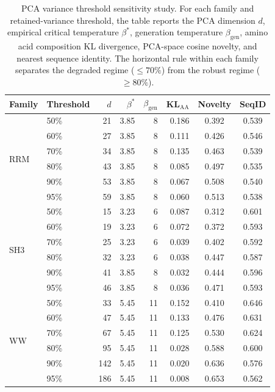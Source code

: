 \begin{table}[p]
\centering
\caption{PCA variance threshold sensitivity study. For each family and retained-variance threshold, the table reports the PCA dimension $d$, empirical critical temperature $\beta^*$, generation temperature $\beta_{\mathrm{gen}}$, amino acid composition KL divergence, PCA-space cosine novelty, and nearest sequence identity. The horizontal rule within each family separates the degraded regime ($\leq 70\%$) from the robust regime ($\geq 80\%$).}
\label{tab:pca-sensitivity}
\scriptsize
\setlength{\tabcolsep}{4pt}
\renewcommand{\arraystretch}{0.85}
\begin{tabular}{@{}llrrrrcc@{}}
\toprule
Family & Threshold & $d$ & $\beta^*$ & $\beta_{\mathrm{gen}}$ & KL$_{\mathrm{AA}}$ & Novelty & SeqID \\
\midrule
\multirow{6}{*}{RRM}
 & 50\% &  21 & 3.85 &  8 & 0.186 & 0.392 & 0.539 \\
 & 60\% &  27 & 3.85 &  8 & 0.111 & 0.426 & 0.546 \\
 & 70\% &  34 & 3.85 &  8 & 0.135 & 0.463 & 0.539 \\
\cmidrule{2-8}
 & 80\% &  43 & 3.85 &  8 & 0.085 & 0.497 & 0.535 \\
 & 90\% &  53 & 3.85 &  8 & 0.067 & 0.508 & 0.540 \\
 & 95\% &  59 & 3.85 &  8 & 0.060 & 0.513 & 0.538 \\
\midrule
\multirow{6}{*}{SH3}
 & 50\% &  15 & 3.23 &  6 & 0.087 & 0.312 & 0.601 \\
 & 60\% &  19 & 3.23 &  6 & 0.072 & 0.372 & 0.593 \\
 & 70\% &  25 & 3.23 &  6 & 0.039 & 0.402 & 0.592 \\
\cmidrule{2-8}
 & 80\% &  32 & 3.23 &  6 & 0.038 & 0.447 & 0.587 \\
 & 90\% &  41 & 3.85 &  8 & 0.032 & 0.444 & 0.596 \\
 & 95\% &  46 & 3.85 &  8 & 0.036 & 0.471 & 0.593 \\
\midrule
\multirow{6}{*}{WW}
 & 50\% &  33 & 5.45 & 11 & 0.152 & 0.410 & 0.646 \\
 & 60\% &  47 & 5.45 & 11 & 0.133 & 0.476 & 0.631 \\
 & 70\% &  67 & 5.45 & 11 & 0.125 & 0.530 & 0.624 \\
\cmidrule{2-8}
 & 80\% &  95 & 5.45 & 11 & 0.028 & 0.588 & 0.600 \\
 & 90\% & 142 & 5.45 & 11 & 0.020 & 0.636 & 0.576 \\
 & 95\% & 186 & 5.45 & 11 & 0.008 & 0.653 & 0.562 \\

\end{tabular}
\end{table}
